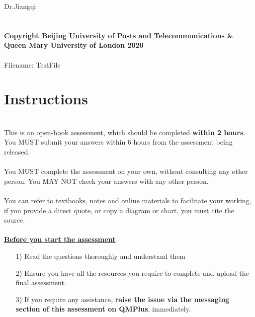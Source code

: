 \documentclass[11pt]{article}
\begin{document}
	\hspace{2em}Dr.Jiangqi
	~\\~\\~\\
	\textbf{\footnotesize Copyright  Beijing University of Posts and Telecommunications \&  Queen Mary University of London 2020}\\
	~\\
	Filename: TestFile
	
	
	\newpage
	\thispagestyle{empty}
	\part*{{\Large Instructions}}
	~\\
	This is an open-book assessment, which should be completed \textbf{within 2 hours}. You MUST submit your answers within 6 hours from the assessment being released.\\
	~\\
	
	You MUST complete the assessment on your own, without consulting any other person. You MAY NOT check your answers with any other person.\\
	~\\
	
	You can refer to textbooks, notes and online materials to facilitate your working, if you provide a direct quote, or copy a diagram or chart, you must cite the source.\\
	~\\
	
	\textbf{\underline{Before you start the assessment}}
	\begin{enumerate}
		\item[1) ] Read the questions thoroughly and understand them
		\item[2) ] Ensure you have all the resources you require to complete and upload the final assessment.
		\item[3) ] If you require any assistance, \textbf{raise the issue via the messaging section of this assessment on QMPlus}, immediately.
	\end{enumerate}
	~\\
	
\end{document}
